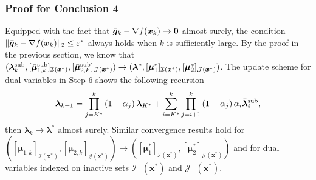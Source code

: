 \documentclass[aos]{imsart}
\numberwithin{equation}{section}
\theoremstyle{plain}
\begin{document}
\begin{appendix}
   \subsubsection{Proof for Conclusion 4}
   Equipped with the fact that $\Bar{\bm{g}}_{k} - \nabla f(\bm{x}_k) \to \bm{0}$ almost surely, the condition $\|\Bar{\bm{g}}_{k} - \nabla f(\bm{x}_k) \|_2 \leq \varepsilon^{*}$ always holds when $k$ is sufficiently large. By the proof in the previous section, we know that $(\Bar{\bm{\lambda}}_k^{\text{sub}},  [\Bar{\bm{\mu}}_{1,k}^{\text{sub}} ]_{\mathcal{I}(\bm{x}^{*})}, [\Bar{\bm{\mu}}_{2,k}^{\text{sub}}]_{\mathcal{J}(\bm{x}^{*})}) \to (\bm{\lambda}^{*}, [\bm{\mu}^{*}_{1}]_{\mathcal{I}(\bm{x}^{*})}, [\bm{\mu}_{2}^{*}]_{\mathcal{J}(\bm{x}^{*})})$. The update scheme for dual variables in Step 6 shows the following recursion
    \begin{equation*}
        \bm{\lambda}_{k+1} = \prod_{j=K^{*}}^{k} \left( 1- \alpha_{j} \right) \bm{\lambda}_{K^{*}} + \sum_{i=K^{*}}^{k} \prod_{j=i+1}^{k} \left( 1- \alpha_{j} \right) \alpha_{i} \Bar{\bm{\lambda}}_{i}^{\text{sub}},
    \end{equation*}
    then $\bm{\lambda}_{k} \to \bm{\lambda}^{*}$ almost surely. Similar convergence results hold for $([\bm{\mu}_{1,k}]_{\mathcal{I}(\bm{x}^{*})}, [ \bm{\mu}_{2,k}]_{\mathcal{J}(\bm{x}^{*})}) \to ([\bm{\mu}^{*}_{1}]_{\mathcal{I}(\bm{x}^{*})}, [\bm{\mu}_{2}^{*}]_{\mathcal{J}(\bm{x}^{*})})$ and for dual variables indexed on inactive sets $\mathcal{I}^{-}(\bm{x}^{*})$ and $\mathcal{J}^{-}(\bm{x}^{*})$. 



\end{appendix}
\end{document}
